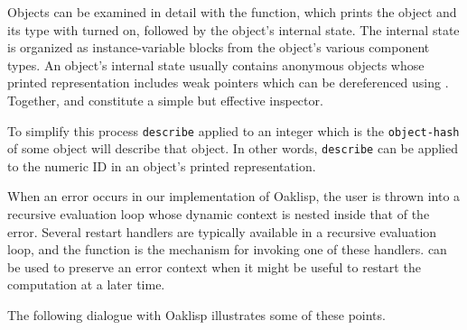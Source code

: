 

Objects can be examined in detail with the 
function, which prints the object and its type with
 turned on, followed by the object's
internal state.  The internal state is organized as instance-variable
blocks from the object's various component types.  An object's
internal state usually contains anonymous objects whose printed
representation includes weak pointers which can be dereferenced using
.  Together,  and 
constitute a simple but effective inspector.

To simplify this process \texttt{describe} applied to an integer which is
the \texttt{object-hash} of some object will describe that object.  In
other words, \texttt{describe} can be applied to the numeric ID in an
object's printed representation.




When an error occurs in our implementation of Oaklisp, the
user is thrown into a recursive evaluation loop whose dynamic context
is nested inside that of the error.  Several restart handlers are
typically available in a recursive evaluation loop, and the 
function is the mechanism for invoking one of these handlers.
 can be used to preserve an error context when it might
be useful to restart the computation at a later time.



The following dialogue with Oaklisp illustrates some of these
points.

